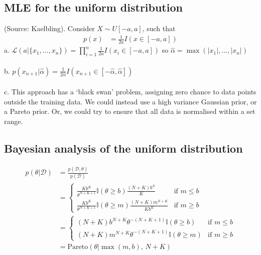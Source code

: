 \subsection{MLE for the uniform distribution}
(Source: Kaelbling). Consider $X \sim U[-a,a]$, such that
\begin{align*}
p(x) &= \frac{1}{2a}I(x\in[-a,a])
\end{align*}
a. $\mathcal{L}(a|\{x_1,\dots,x_n\}) = \prod_{i=1}^{n}\frac{1}{2a}I(x_i\in[-a,a])$ so $\hat\alpha=\max(|x_1|,\dots,|x_n|)$\\\\
b. $p(x_{n+1}|\hat\alpha) = \frac{1}{2\hat\alpha}I(x_{n+1}\in[-\hat\alpha, \hat\alpha])$\\\\
c. This approach has a `black swan' problem, assigning zero chance to data points outside the training data. We could instead use a high variance Gaussian prior, or a Pareto prior. Or, we could try to ensure that all data is normalised within a set range.

\subsection{Bayesian analysis of the uniform distribution}
\begin{align*}
p(\theta|\mathcal{D}) &= \frac{p(\mathcal{D},\theta)}{p(\mathcal{D})}\\
&= \begin{cases}
\frac{Kb^K}{\theta^{N+K+1}} \mathbb{I}(\theta\geq b) \frac{(N+K)b^N}{K} &\text{if $m\leq b$}\\
\frac{Kb^K}{\theta^{N+K+1}} \mathbb{I}(\theta\geq m) \frac{(N+K)m^{N+K}}{Kb^K} &\text{if $m\geq b$}
\end{cases}\\
&= \begin{cases}
(N+K)b^{N+K}\theta^{-(N+K+1)}\mathbb{I}(\theta\geq b) &\text{if $m\leq b$}\\
(N+K)m^{N+K}\theta^{-(N+K+1)}\mathbb{I}(\theta\geq m) &\text{if $m\geq b$}
\end{cases}\\
&= \mathrm{Pareto}(\theta|\max(m,b),\,N+K)
\end{align*}

